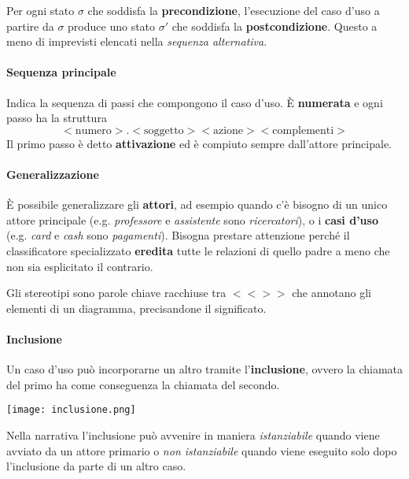 \begin{definition}
	Per ogni stato $\sigma$ che soddisfa la \textbf{precondizione}, l'esecuzione del caso d'uso a partire da $\sigma$ produce uno stato $\sigma '$ che soddisfa la \textbf{postcondizione}. Questo a meno di imprevisti elencati nella \textit{sequenza alternativa}.
\end{definition}

\paragraph{Sequenza principale}
Indica la sequenza di passi che compongono il caso d'uso. È \textbf{numerata} e ogni passo ha la struttura
\begin{equation*}
	<\text{numero}>.<\text{soggetto}><\text{azione}><\text{complementi}>
\end{equation*}
Il primo passo è detto \textbf{attivazione} ed è compiuto sempre dall'attore principale.

\paragraph{Generalizzazione} È possibile generalizzare gli \textbf{attori}, ad esempio quando c'è bisogno di un unico attore principale (e.g. \textit{professore} e \textit{assistente} sono \textit{ricercatori}), o i \textbf{casi d'uso} (e.g. \textit{card} e \textit{cash} sono \textit{pagamenti}). Bisogna prestare attenzione perché il classificatore specializzato \textbf{eredita} tutte le relazioni di quello padre a meno che non sia esplicitato il contrario.

\begin{definition}[Stereotipo]
	Gli stereotipi sono parole chiave racchiuse tra $<<>>$ che annotano gli elementi di un diagramma, precisandone il significato.
\end{definition}

\paragraph{Inclusione} Un caso d'uso può incorporarne un altro tramite l'\textbf{inclusione}, ovvero la chiamata del primo ha come conseguenza la chiamata del secondo.
\begin{center}
	\texttt{[image: inclusione.png]}
\end{center}
Nella narrativa l'inclusione può avvenire in maniera \textit{istanziabile} quando viene avviato da un attore primario o \textit{non istanziabile} quando viene eseguito solo dopo l'inclusione da parte di un altro caso.

